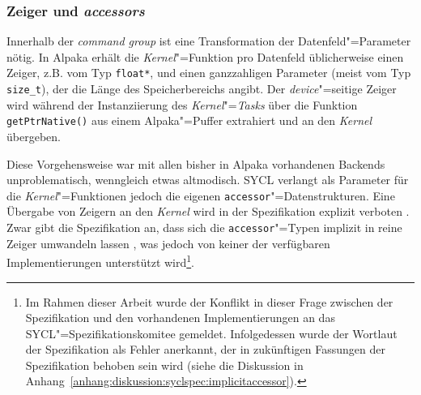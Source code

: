 \subsubsection{Zeiger und \textit{accessors}}

Innerhalb der \textit{command group} ist eine Transformation der
Datenfeld"=Parameter nötig. In Alpaka erhält die \textit{Kernel}"=Funktion pro
Datenfeld üblicherweise einen Zeiger, z.B. vom Typ \texttt{float*}, und einen
ganzzahligen Parameter (meist vom Typ \texttt{size\_t}), der die Länge des
Speicherbereichs angibt. Der \textit{device}"=seitige Zeiger wird während der
Instanziierung des \textit{Kernel}"=\textit{Tasks} über die Funktion
\texttt{getPtrNative()} aus einem Alpaka"=Puffer extrahiert und an den
\textit{Kernel} übergeben.

Diese Vorgehensweise war mit allen bisher in Alpaka vorhandenen Backends
unproblematisch, wenngleich etwas altmodisch. SYCL verlangt als Parameter für
die \textit{Kernel}"=Funktionen jedoch die eigenen \texttt{accessor}"=Datenstrukturen.
Eine Übergabe von Zeigern an den \textit{Kernel} wird in der Spezifikation explizit
verboten \cite[vgl.][192]{sycl2019}. Zwar gibt die Spezifikation an, dass sich
die \texttt{accessor}"=Typen implizit in reine Zeiger umwandeln lassen
\cite[vgl.][27]{sycl2019}, was jedoch von keiner der verfügbaren
Implementierungen unterstützt wird\footnote{Im Rahmen dieser Arbeit wurde der
Konflikt in dieser Frage zwischen der Spezifikation und den vorhandenen
Implementierungen an das SYCL"=Spezifikationskomitee gemeldet. Infolgedessen
wurde der Wortlaut der Spezifikation als Fehler anerkannt, der in zukünftigen
Fassungen der Spezifikation behoben sein wird (siehe die Diskussion in
Anhang~\ref{anhang:diskussion:syclspec:implicitaccessor}).}.


